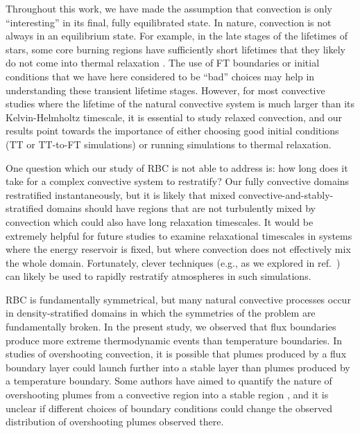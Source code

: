 \documentclass[aps, pre, onecolumn, nofootinbib, notitlepage, groupedaddress, amsfonts, amssymb, amsmath, longbibliography, superscriptaddress]{revtex4-1}
\begin{document}
Throughout this work, we have made the assumption that convection is only ``interesting'' in its final, fully equilibrated state.
In nature, convection is not always in an equilibrium state.
For example, in the late stages of the lifetimes of stars, some core burning regions have sufficiently short lifetimes that they likely do not come into thermal relaxation \citep{clarkson&all2018, andrassy&all2020}.
The use of FT boundaries or initial conditions that we have here considered to be ``bad'' choices may help in understanding these transient lifetime stages.
However, for most convective studies where the lifetime of the natural convective system is much larger than its Kelvin-Helmholtz timescale, it is essential to study relaxed convection, and our results point towards the importance of either choosing good initial conditions (TT or TT-to-FT simulations) or running simulations to thermal relaxation.

One question which our study of RBC is not able to address is: how long does it take for a complex convective system to restratify?
Our fully convective domains restratified instantaneously, but it is likely that mixed convective-and-stably-stratified domains \citep{brummell&all2002, kapyla&all2019, pratt&all2017, korre&all2019} should have regions that are not turbulently mixed by convection which could also have long relaxation timescales.
It would be extremely helpful for future studies to examine relaxational timescales in systems where the energy reservoir is fixed, but where convection does not effectively mix the whole domain.
Fortunately, clever techniques (e.g., as we explored in ref.~\cite{anders&all2018}) can likely be used to rapidly restratify atmospheres in such simulations.

RBC is fundamentally symmetrical, but many natural convective processes occur in density-stratified domains in which the symmetries of the problem are fundamentally broken.
In the present study, we observed that flux boundaries produce more extreme thermodynamic events than temperature boundaries.
In studies of overshooting convection, it is possible that plumes produced by a flux boundary layer could launch further into a stable layer than plumes produced by a temperature boundary.
Some authors have aimed to quantify the nature of overshooting plumes from a convective region into a stable region \cite{pratt&all2017, korre&all2019}, and it is unclear if different choices of boundary conditions could change the observed distribution of overshooting plumes observed there.
\end{document}
